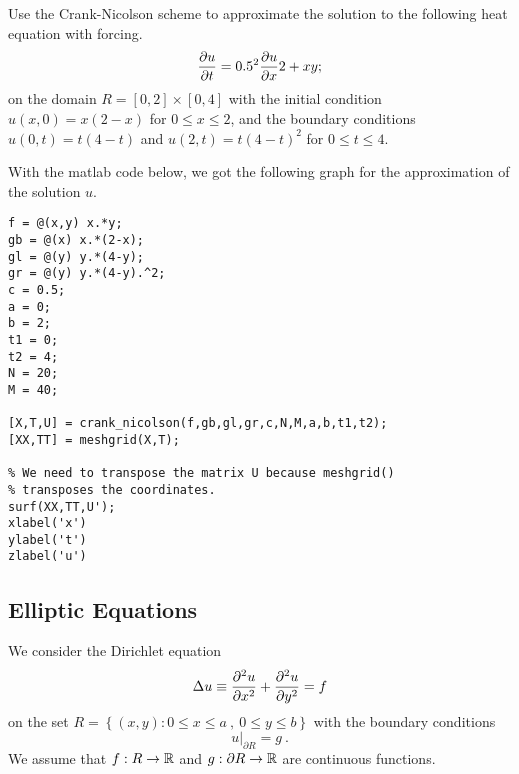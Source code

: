 \begin{egg}
Use the Crank-Nicolson scheme to approximate the solution to
the following heat equation with forcing.
\[
\frac{\partial{u}}{\partial{t}} = 0.5^2 \frac{\partial{u}}{\partial{x}}{2} + xy;
\]
on the domain $R=[0,2] \times [0,4]$ with the initial condition
$u(x,0) = x(2-x)$ for $0 \leq x \leq 2$, and the boundary conditions
$u(0,t) = t(4-t)$ and $u(2,t) = t(4-t)^2$ for $0 \leq t \leq 4$.

With the matlab code below, we got the following graph for the
approximation of the solution $u$.

\begin{code}
\small
\begin{verbatim}
f = @(x,y) x.*y;
gb = @(x) x.*(2-x);
gl = @(y) y.*(4-y);
gr = @(y) y.*(4-y).^2;
c = 0.5;
a = 0;
b = 2;
t1 = 0;
t2 = 4;
N = 20;
M = 40;

[X,T,U] = crank_nicolson(f,gb,gl,gr,c,N,M,a,b,t1,t2);
[XX,TT] = meshgrid(X,T);

% We need to transpose the matrix U because meshgrid()
% transposes the coordinates.
surf(XX,TT,U');
xlabel('x')
ylabel('t')
zlabel('u')
\end{verbatim}
\end{code}
\end{egg}

\subsection{Elliptic Equations} \label{DirEquSection}

We consider the Dirichlet equation
\begin{equation} \label{DirEqu}
\Delta u \equiv \frac{\partial^{2}{u}}{\partial{x}^{2}} + \frac{\partial^{2}{u}}{\partial{y}^{2}} = f
\end{equation}
on the set $R = \left\{ (x,y) : 0 \leq x \leq a \ , \ 0 \leq y \leq b \right\}$
with the boundary conditions
\[
u\big|_{\partial R} = g \ .
\]
We assume that $f:R \rightarrow \mathbb{R}$ and $g:\partial R \rightarrow \mathbb{R}$
are continuous functions.

